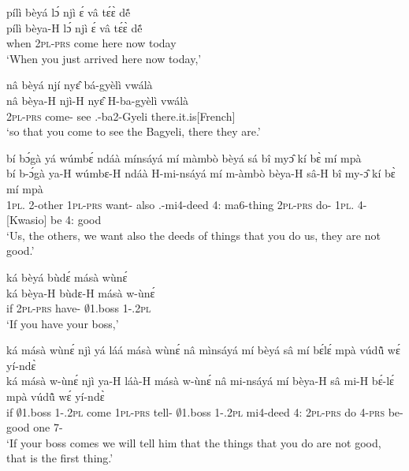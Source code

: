 \begin{exe}[(C234)] 
\exC\label{97}
  \glll pílì bèyá lɔ́ njì ɛ́ vâ tɛ́ɛ̀ dẽ́  \\ 
       pílì bèya-H lɔ́ njì ɛ́ vâ tɛ́ɛ̀ dẽ́ \\
         when 2\textsc{pl}-\textsc{prs} {\RETRO}  come {\LOC} here now today  \\
    \trans `When you just arrived here now today,'
 
\exC\label{98} 
  \glll  nâ bèyá njí nyɛ̂ bá-gyèlì vwálà \\
      nâ bèya-H njì-H nyɛ̂ H-ba-gyèlì vwálà \\
          {\COMP} 2\textsc{pl}-\textsc{prs} come-{\R} see {\OBJ}.{\LINK}-ba2-Gyeli there.it.is[French]  \\
    \trans `so that you come to see the Bagyeli, there they are.'
 
\exC\label{99}
  \glll  bí bɔ́gà yá wúmbɛ́ ndáà mínsáyá mí màmbò bèyá sá bî myɔ̂ kí bɛ̀ mí mpà \\
         bí b-ɔ́gà ya-H wúmbɛ-H ndáà H-mi-nsáyá mí m-àmbò bèya-H sâ-H bî my-ɔ̂ kí bɛ̀ mí mpà \\
          1\textsc{pl}.{\SBJ}  2-other 1\textsc{pl}-\textsc{prs} want-{\R} also {\OBJ}.{\LINK}-mi4-deed 4:{\ATT}  ma6-thing 2\textsc{pl}-\textsc{prs} do-{\R} 1\textsc{pl}.{\OBJ} 4-{\OBJ} {\NEG}[Kwasio] be 4:{\ATT} good \\
    \trans `Us, the others, we want also the deeds of things that you do us, they are not good.'
 
\exC\label{100} 
  \glll ká bèyá bùdɛ́ másà wùnɛ́ \\ 
        ká bèya-H bùdɛ-H másà w-ùnɛ́ \\
         if 2\textsc{pl}-\textsc{prs} have-{\R} $\emptyset$1.boss 1-{\POSS}.2\textsc{pl}   \\
    \trans `If you have your boss,'
 
\exC\label{101}
  \glll  ká másà wùnɛ́ njì yá láá másà wùnɛ́ nâ mìnsáyá mí bèyá sâ mí bɛ́lɛ́ mpà vúdũ̂ wɛ́ yí-ndɛ̀ \\
         ká másà w-ùnɛ́ njì ya-H láà-H másà w-ùnɛ́ nâ mi-nsáyá mí bèya-H sâ mi-H bɛ́-lɛ́ mpà vúdũ̂ wɛ́ yí-ndɛ̀\\
         if $\emptyset$1.boss 1-{\POSS}.2\textsc{pl} come 1\textsc{pl}-\textsc{prs} tell-{\R} $\emptyset$1.boss 1-{\POSS}.2\textsc{pl} {\COMP} mi4-deed 4:{\ATT}  2\textsc{pl}-\textsc{prs} do 4-\textsc{prs} be-{\NEG} good one {\ID} 7-{\ANA} \\
    \trans `If your boss comes we will tell him that the things that you do are not good, that is the first thing.'
 

\end{exe}

